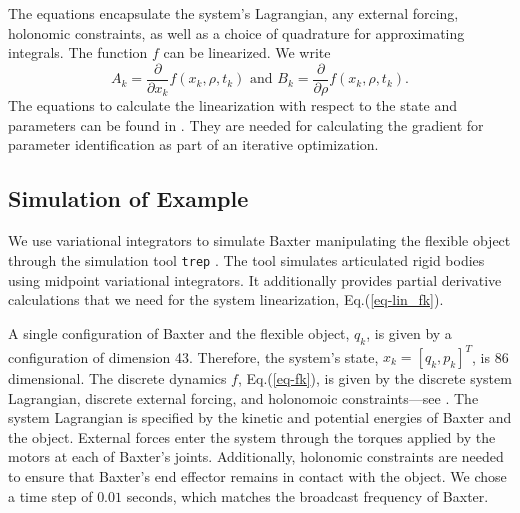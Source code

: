 \documentclass[runningheads,a4paper]{llncs}
\begin{document}
The equations encapsulate the system's Lagrangian, any external forcing, holonomic constraints, as well as a choice of quadrature for approximating integrals.  The function $f$ can be linearized. We write 
\begin{equation}
A_k = \frac{\partial}{\partial x_k}f(x_k,\rho,t_k) \textrm{ and } B_k = \frac{\partial}{\partial \rho}f(x_k,\rho,t_k).
\label{eq-lin_fk}
\end{equation}
The equations to calculate the linearization with respect to the state and parameters can be found in \cite{caldwell_coleman_correll_iros}. They are needed for calculating the gradient for parameter identification as part of an iterative optimization.

\subsection{Simulation of Example}
We use variational integrators to simulate Baxter manipulating the flexible object through the simulation tool \texttt{trep} \cite{johnson_murphey_scalable}.  The tool simulates articulated rigid bodies using midpoint variational integrators.  It additionally provides partial derivative calculations that we need for the system linearization, Eq.(\ref{eq-lin_fk}). 

A single configuration of Baxter and the flexible object, $q_k$, is given by a configuration of dimension 43. Therefore, the system's state,  $x_k = [q_k,p_k]^T$, is 86 dimensional. The discrete dynamics $f$, Eq.(\ref{eq-fk}), is given by the discrete system Lagrangian, discrete external forcing, and holonomoic constraints---see \cite{caldwell_coleman_correll_iros,marsden_west}.  The system Lagrangian is specified by the kinetic and potential energies of Baxter and the object.  External forces enter the system through the torques applied by the motors at each of Baxter's joints.  Additionally, holonomic constraints are needed to ensure that Baxter's end effector remains in contact with the object.  We chose a time step of $0.01$ seconds, which matches the broadcast frequency of Baxter. 
\end{document}
